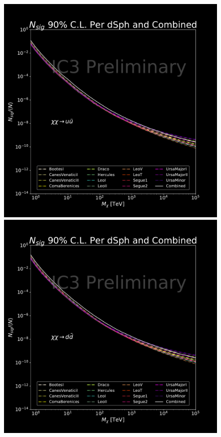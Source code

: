 \begin{figure}[h!]
{        \includegraphics[scale=0.265]{figures/ic_DM/dm_plots/uu_money_plot_comb_ns.pdf}
        \includegraphics[scale=0.265]{figures/ic_DM/dm_plots/dd_money_plot_comb_ns.pdf}
}
\end{figure}
